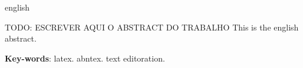 \begin{resumo}[Abstract]
 \begin{otherlanguage*}{english}
 
 TODO: ESCREVER AQUI O ABSTRACT DO TRABALHO
   This is the english abstract.

   \vspace{\onelineskip}
 
   \noindent 
   \textbf{Key-words}: latex. abntex. text editoration.
 \end{otherlanguage*}
\end{resumo}
